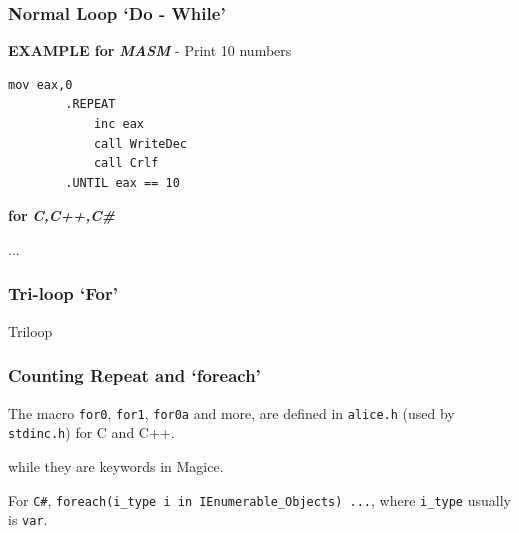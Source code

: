 \subsubsection{Normal Loop `Do - While'}

\textbf{EXAMPLE for }\textbf{\textit{MASM}} - Print 10 numbers

\begin{lstlisting}[language={[x86masm]Assembler}]
		mov eax,0
		.REPEAT
			inc eax
			call WriteDec
			call Crlf
		.UNTIL eax == 10
	\end{lstlisting}

\textbf{for }\textbf{\textit{C,C++,C\#}}

...



\subsubsection{Tri-loop `For'}

{Triloop}



\subsubsection{Counting Repeat and `foreach'}

The macro \texttt{for0}, \texttt{for1}, \texttt{for0a} and more, are defined in \verb|alice.h| (used by \verb|stdinc.h|) for C and C++.

while they are keywords in Magice.

For \verb|C#|, \verb|foreach(i_type i in IEnumerable_Objects) ...|, where \verb|i_type| usually is \verb|var|.

